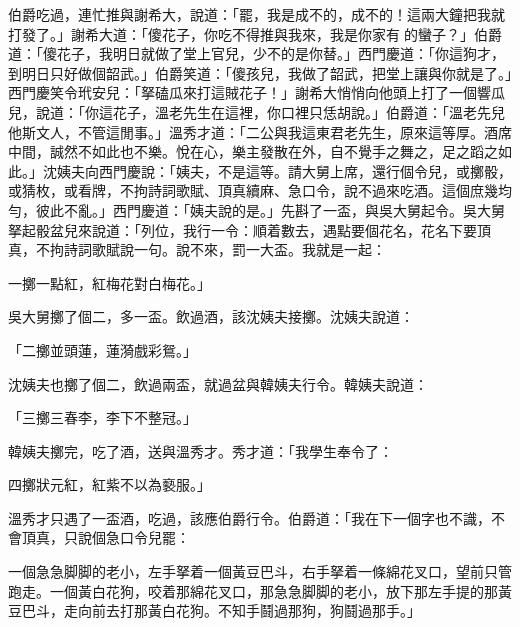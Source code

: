 伯爵吃過，連忙推與謝希大，說道：「罷，我是成不的，成不的！這兩大鐘把我就打發了。」謝希大道：「傻花子，你吃不得推與我來，我是你家有𣬼的蠻子？」伯爵道：「傻花子，我明日就做了堂上官兒，少不的是你替。」西門慶道：「你這狗才，到明日只好做個韶武。」伯爵笑道：「傻孩兒，我做了韶武，把堂上讓與你就是了。」西門慶笑令玳安兒：「拏磕瓜來打這賊花子！」謝希大悄悄向他頭上打了一個響瓜兒，說道：「你這花子，溫老先生在這裡，你口裡只恁胡說。」伯爵道：「溫老先兒他斯文人，不管這閒事。」溫秀才道：「二公與我這東君老先生，原來這等厚。酒席中間，誠然不如此也不樂。悅在心，樂主發散在外，自不覺手之舞之，足之蹈之如此。」{}沈姨夫向西門慶說：「姨夫，不是這等。請大舅上席，還行個令兒，或擲骰，或猜枚，或看牌，不拘詩詞歌賦、頂真續麻、急口令，說不過來吃酒。這個庶幾均勻，彼此不亂。」西門慶道：「姨夫說的是。」先斟了一盃，與吳大舅起令。吳大舅拏起骰盆兒來說道：「列位，我行一令：順着數去，遇點要個花名，花名下要頂真，不拘詩詞歌賦說一句。說不來，罰一大盃。我就是一起：

\begin{myquote}
一擲一點紅，紅梅花對白梅花。」
\end{myquote}

吳大舅擲了個二，多一盃。飲過酒，該沈姨夫接擲。沈姨夫說道：

\begin{myquote}
「二擲並頭蓮，蓮漪戲彩鴛。」
\end{myquote}

沈姨夫也擲了個二，飲過兩盃，就過盆與韓姨夫行令。韓姨夫說道：

\begin{myquote}
「三擲三春李，李下不整冠。」
\end{myquote}

韓姨夫擲完，吃了酒，送與溫秀才。秀才道：「我學生奉令了：

\begin{myquote}
四擲狀元紅，紅紫不以為褻服。」{}
\end{myquote}

溫秀才只遇了一盃酒，吃過，該應伯爵行令。伯爵道：「我在下一個字也不識，不會頂真，只說個急口令兒罷：

\begin{myquote}
一個急急脚脚的老小，左手拏着一個黃豆巴斗，右手拏着一條綿花叉口，望前只管跑走。一個黃白花狗，咬着那綿花叉口，那急急脚脚的老小，放下那左手提的那黃豆巴斗，走向前去打那黃白花狗。不知手鬪過那狗，狗鬪過那手。」
\end{myquote}

